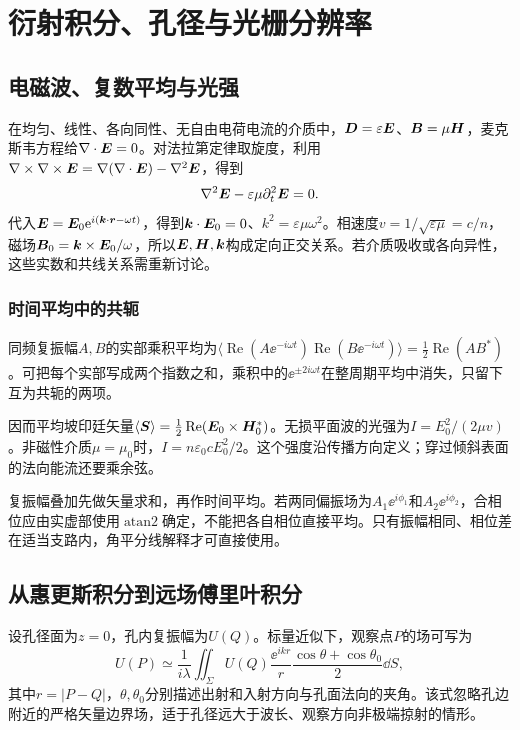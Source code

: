 \chapter{衍射积分、孔径与光栅分辨率}
\section{电磁波、复数平均与光强}\label{th:o3wave}
在均匀、线性、各向同性、无自由电荷电流的介质中，$\bm{D}=\varepsilon\bm{E}$、$\bm{B}=\mu\bm{H}$，麦克斯韦方程给$\nabla\cdot\bm{E}=0$。对法拉第定律取旋度，利用$\nabla\times\nabla\times\bm{E}=\nabla(\nabla\cdot\bm{E})-\nabla^2\bm{E}$，得到
\[
 \nabla^2\bm{E}-\varepsilon\mu\partial_t^2\bm{E}=0.
\]
代入$\bm{E}=\bm{E}_0\mathrm e^{i(\bm{k}\cdot\bm{r}-\omega t)}$，得到$\bm{k}\cdot\bm{E}_0=0$、$k^2=\varepsilon\mu\omega^2$。相速度$v=1/\sqrt{\varepsilon\mu}=c/n$，磁场$\bm{B}_0=\bm{k}\times\bm{E}_0/\omega$，所以$\bm{E},\bm{H},\bm{k}$构成定向正交关系。若介质吸收或各向异性，这些实数和共线关系需重新讨论。

\subsection{时间平均中的共轭}\label{th:o3intensity}
同频复振幅$A,B$的实部乘积平均为$\langle\operatorname{Re}(A\ee^{-i\omega t})\operatorname{Re}(B\ee^{-i\omega t})\rangle=\tfrac12\operatorname{Re}(AB^*)$。可把每个实部写成两个指数之和，乘积中的$\ee^{\pm2i\omega t}$在整周期平均中消失，只留下互为共轭的两项。

因而平均坡印廷矢量$\langle\bm{S}\rangle=\tfrac12\operatorname{Re}(\bm{E}_0\times\bm{H}_0^*)$。无损平面波的光强为$I=E_0^2/(2\mu v)$。非磁性介质$\mu=\mu_0$时，$I=n\varepsilon_0cE_0^2/2$。这个强度沿传播方向定义；穿过倾斜表面的法向能流还要乘余弦。

复振幅叠加先做矢量求和，再作时间平均。若两同偏振场为$A_1\ee^{i\phi_1}$和$A_2\ee^{i\phi_2}$，合相位应由实虚部使用$\operatorname{atan2}$确定，不能把各自相位直接平均。只有振幅相同、相位差在适当支路内，角平分线解释才可直接使用。

\section{从惠更斯积分到远场傅里叶积分}\label{th:o3integral}
设孔径面为$z=0$，孔内复振幅为$U(Q)$。标量近似下，观察点$P$的场可写为
\[
 U(P)\simeq\frac1{i\lambda}\iint_\Sigma
 U(Q)\frac{\ee^{ikr}}r\frac{\cos\theta+\cos\theta_0}2\dd S,
\]
其中$r=|P-Q|$，$\theta,\theta_0$分别描述出射和入射方向与孔面法向的夹角。该式忽略孔边附近的严格矢量边界场，适于孔径远大于波长、观察方向非极端掠射的情形。

